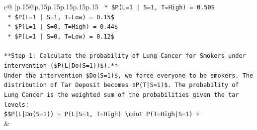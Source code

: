 \documentclass{article}
\begin{document}
{\begin{supertabular}{c@{$\;$}|p{.15\linewidth}@{}p{.15\linewidth}p{.15\linewidth}p{.15\linewidth}p{.15\linewidth}p{.15\linewidth}}
{{{\texttt{    *   \$P(L=1 | S=1, T=High) = 0.50\$} \\
\texttt{    *   \$P(L=1 | S=1, T=Low) = 0.15\$} \\
\texttt{    *   \$P(L=1 | S=0, T=High) = 0.44\$} \\
\texttt{    *   \$P(L=1 | S=0, T=Low) = 0.12\$} \\
\\ 
\texttt{**Step 1: Calculate the probability of Lung Cancer for Smokers under intervention (\$P(L|Do(S=1))\$).**} \\
\texttt{Under the intervention \$Do(S=1)\$, we force everyone to be smokers. The distribution of Tar Deposit becomes \$P(T|S=1)\$. The probability of Lung Cancer is the weighted sum of the probabilities given the tar levels:} \\
\texttt{\$\$P(L|Do(S=1)) = P(L|S=1, T=High) \textbackslash{}cdot P(T=High|S=1) +} \\
            }
        }
    }
    & \\ \\


\end{supertabular}}
\end{document}

